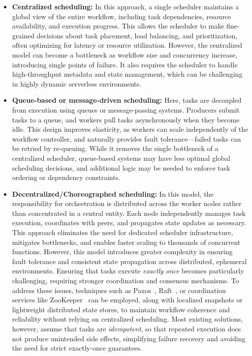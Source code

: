 \begin{itemize}
\item \textbf{Centralized scheduling:} In this approach, a single scheduler maintains a global view of the entire workflow, including task dependencies, resource availability, and execution progress. This allows the scheduler to make fine-grained decisions about task placement, load balancing, and prioritization, often optimizing for latency or resource utilization. However, the centralized model can become a bottleneck as workflow size and concurrency increase, introducing single points of failure. It also requires the scheduler to handle high-throughput metadata and state management, which can be challenging in highly dynamic serverless environments.

\item \textbf{Queue-based or message-driven scheduling:} Here, tasks are decoupled from execution using queues or message-passing systems. Producers submit tasks to a queue, and workers pull tasks asynchronously when they become idle. This design improves elasticity, as workers can scale independently of the workflow controller, and naturally provides fault tolerance—failed tasks can be retried by re-queuing. While it removes the single bottleneck of a centralized scheduler, queue-based systems may have less optimal global scheduling decisions, and additional logic may be needed to enforce task ordering or dependency constraints.

\item \textbf{Decentralized/Choreographed scheduling:} In this model, the responsibility for orchestration is distributed across the worker nodes rather than concentrated in a central entity. Each node independently manages task execution, coordinates with peers, and propagates state updates as necessary. This approach eliminates the need for dedicated scheduler infrastructure, mitigates bottlenecks, and enables faster scaling to thousands of concurrent functions. However, this model introduces greater complexity in ensuring fault tolerance and consistent state propagation across distributed, ephemeral environments. Ensuring that tasks execute \textit{exactly once} becomes particularly challenging, requiring stronger coordination and consensus mechanisms. To address these issues, techniques such as Paxos~\cite{paxos}, Raft~\cite{raft}, or coordination services like ZooKeeper~\cite{zookeeper} can be employed, along with localized snapshots or lightweight distributed state stores, to maintain workflow coherence and reliability without relying on centralized scheduling. Most existing solutions, however, assume that tasks are \textit{idempotent}, so that repeated execution does not produce unintended side effects, simplifying failure recovery and avoiding the need for strict exactly-once guarantees.




\end{itemize}
